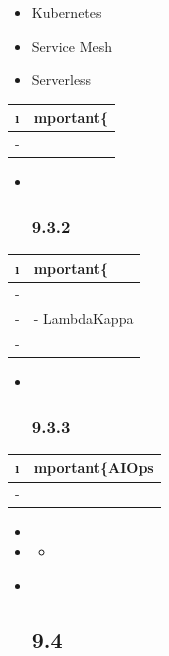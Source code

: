 \important{}

\begin{itemize}
\tightlist
\item
  Kubernetes
\item
  Service Mesh
\item
  Serverless
\end{itemize}

\begin{longtable}[]{@{}ll@{}}
\toprule\noalign{}
\i & mportant\{} \\
\midrule\noalign{}
\endhead
\bottomrule\noalign{}
\endlastfoot
- & \important{} \\
\end{longtable}

\begin{itemize}
\item ~
  \hypertarget{section-28}{%
  \subsubsection{9.3.2}\label{section-28}}
\end{itemize}

\begin{longtable}[]{@{}ll@{}}
\toprule\noalign{}
\i & mportant\{} \\
\midrule\noalign{}
\endhead
\bottomrule\noalign{}
\endlastfoot
- & \important{} \\
- & - LambdaKappa \\
- & \important{} \\
\end{longtable}

\begin{itemize}
\item ~
  \hypertarget{section-29}{%
  \subsubsection{9.3.3}\label{section-29}}
\end{itemize}

\begin{longtable}[]{@{}ll@{}}
\toprule\noalign{}
\i & mportant\{AIOps} \\
\midrule\noalign{}
\endhead
\bottomrule\noalign{}
\endlastfoot
- & \important{} \\
\end{longtable}

\begin{itemize}
\item
\item
  \begin{itemize}
  \tightlist
  \item
  \end{itemize}
\item ~
  \hypertarget{section-30}{%
  \subsection{9.4}\label{section-30}}
\end{itemize}

